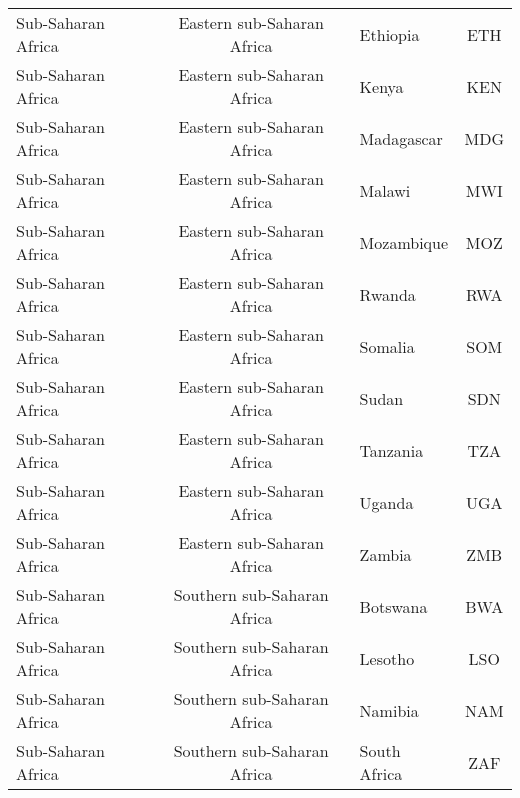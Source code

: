 \begin{landscape}
\begin{longtable}{|p{6cm}|c|p{5cm}|c|}
                               Sub-Saharan Africa &   Eastern sub-Saharan Africa &                                          Ethiopia &  ETH \\
                               Sub-Saharan Africa &   Eastern sub-Saharan Africa &                                             Kenya &  KEN \\
                               Sub-Saharan Africa &   Eastern sub-Saharan Africa &                                        Madagascar &  MDG \\
                               Sub-Saharan Africa &   Eastern sub-Saharan Africa &                                            Malawi &  MWI \\
                               Sub-Saharan Africa &   Eastern sub-Saharan Africa &                                        Mozambique &  MOZ \\
                               Sub-Saharan Africa &   Eastern sub-Saharan Africa &                                            Rwanda &  RWA \\
                               Sub-Saharan Africa &   Eastern sub-Saharan Africa &                                           Somalia &  SOM \\
                               Sub-Saharan Africa &   Eastern sub-Saharan Africa &                                             Sudan &  SDN \\
                               Sub-Saharan Africa &   Eastern sub-Saharan Africa &                                          Tanzania &  TZA \\
                               Sub-Saharan Africa &   Eastern sub-Saharan Africa &                                            Uganda &  UGA \\
                               Sub-Saharan Africa &   Eastern sub-Saharan Africa &                                            Zambia &  ZMB \\
                               Sub-Saharan Africa &  Southern sub-Saharan Africa &                                          Botswana &  BWA \\
                               Sub-Saharan Africa &  Southern sub-Saharan Africa &                                           Lesotho &  LSO \\
                               Sub-Saharan Africa &  Southern sub-Saharan Africa &                                           Namibia &  NAM \\
                               Sub-Saharan Africa &  Southern sub-Saharan Africa &                                      South Africa &  ZAF \\

\end{longtable}
\end{landscape}
